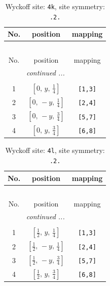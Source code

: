 \documentclass[fleqn,8pt]{jsarticle}
\begin{document}
\renewcommand{\arraystretch}{1.2}
\begin{longtable}{ccc}
\caption{Wyckoff site: {\tt 4k}, site symmetry: {\tt .2.}}
 \\
 \hline \hline
No. & position & mapping \\ \hline \endfirsthead

\multicolumn{2}{l}{\tablename\ \thetable{}} \\
 \hline \hline
No. & position & mapping \\ \hline \endhead

 \hline \hline
\multicolumn{2}{r}{\footnotesize\it continued ...} \\ \endfoot

 \hline \hline
\multicolumn{2}{r}{} \\ \endlastfoot

1 & $\left[ 0,\, y,\, \frac{1}{4} \right]$ & {\tt [1,3]} \\ \hline
2 & $\left[ 0,\, - y,\, \frac{1}{4} \right]$ & {\tt [2,4]} \\ \hline
3 & $\left[ 0,\, - y,\, \frac{3}{4} \right]$ & {\tt [5,7]} \\ \hline
4 & $\left[ 0,\, y,\, \frac{3}{4} \right]$ & {\tt [6,8]} \\
\end{longtable}
\renewcommand{\arraystretch}{1.2}
\begin{longtable}{ccc}
\caption{Wyckoff site: {\tt 4l}, site symmetry: {\tt .2.}}
 \\
 \hline \hline
No. & position & mapping \\ \hline \endfirsthead

\multicolumn{2}{l}{\tablename\ \thetable{}} \\
 \hline \hline
No. & position & mapping \\ \hline \endhead

 \hline \hline
\multicolumn{2}{r}{\footnotesize\it continued ...} \\ \endfoot

 \hline \hline
\multicolumn{2}{r}{} \\ \endlastfoot

1 & $\left[ \frac{1}{2},\, y,\, \frac{1}{4} \right]$ & {\tt [1,3]} \\ \hline
2 & $\left[ \frac{1}{2},\, - y,\, \frac{1}{4} \right]$ & {\tt [2,4]} \\ \hline
3 & $\left[ \frac{1}{2},\, - y,\, \frac{3}{4} \right]$ & {\tt [5,7]} \\ \hline
4 & $\left[ \frac{1}{2},\, y,\, \frac{3}{4} \right]$ & {\tt [6,8]} \\
\end{longtable}
\end{document}
